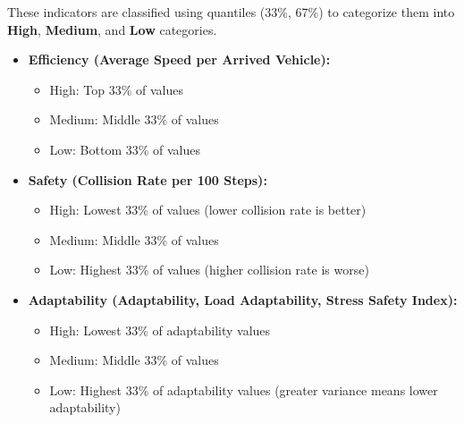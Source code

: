 These indicators are classified using quantiles (33\%, 67\%) to categorize them into \textbf{High}, \textbf{Medium}, and \textbf{Low} categories.

\begin{itemize}
    \item \textbf{Efficiency (Average Speed per Arrived Vehicle):}
    \begin{itemize}
        \item High: Top 33\% of values
        \item Medium: Middle 33\% of values
        \item Low: Bottom 33\% of values
    \end{itemize}

    \item \textbf{Safety (Collision Rate per 100 Steps):}
    \begin{itemize}
        \item High: Lowest 33\% of values (lower collision rate is better)
        \item Medium: Middle 33\% of values
        \item Low: Highest 33\% of values (higher collision rate is worse)
    \end{itemize}

    \item \textbf{Adaptability (Adaptability, Load Adaptability, Stress Safety Index):}
    \begin{itemize}
        \item High: Lowest 33\% of adaptability values
        \item Medium: Middle 33\% of values
        \item Low: Highest 33\% of adaptability values (greater variance means lower adaptability)
    \end{itemize}
\end{itemize}


